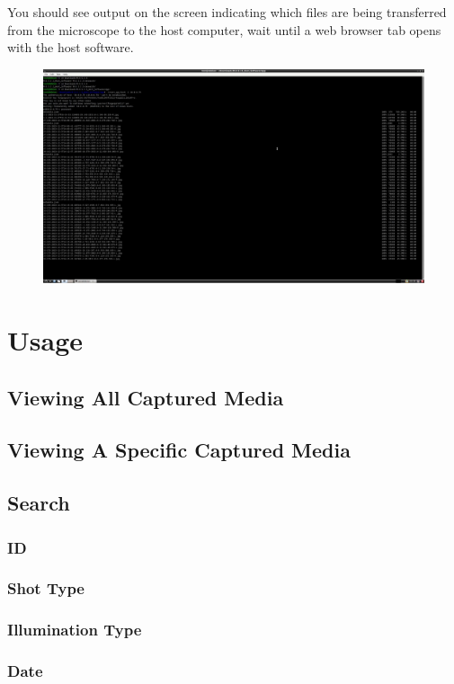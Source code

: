 \documentclass[12pt]{article}
\begin{document}
\begin{center}
\begin{figure}[H]
	\end{figure}
	\item You should see output on the screen indicating which files are being transferred from the microscope to the host computer, wait until a web browser tab opens with the host software.
	\begin{figure}[H]
		\includegraphics[width=\textwidth]{Figures/Linux-Transfer-Files.png}
	\end{figure}
	\section{Usage}
	\subsection{Viewing All Captured Media}
	\subsection{Viewing A Specific Captured Media}
	\subsection{Search}
	\subsubsection{ID}
	\subsubsection{Shot Type}
	\subsubsection{Illumination Type}
	\subsubsection{Date}

\end{center}
\end{document}
